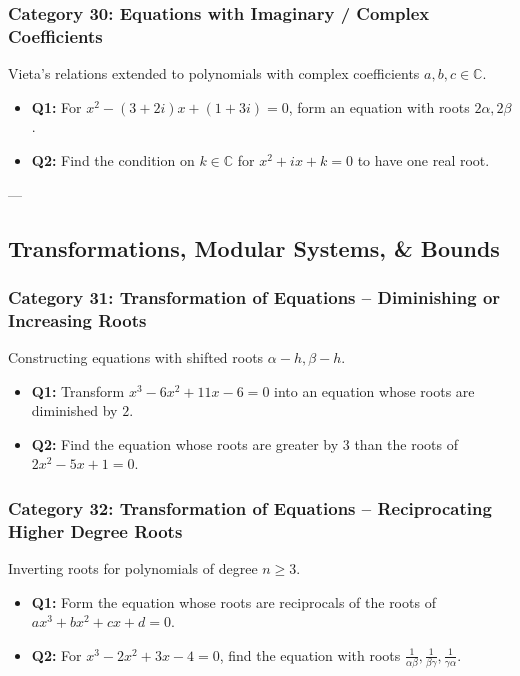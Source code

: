 \documentclass[10pt,a4paper]{article}
\begin{document}
\subsubsection{Category 30: Equations with Imaginary / Complex Coefficients}
Vieta's relations extended to polynomials with complex coefficients $a,b,c \in \mathbb{C}$.
\begin{itemize}[leftmargin=*]
    \item \textbf{Q1:} For $x^2 - (3+2i)x + (1+3i) = 0$, form an equation with roots $2\alpha, 2\beta$.
    \item \textbf{Q2:} Find the condition on $k \in \mathbb{C}$ for $x^2 + ix + k = 0$ to have one real root.
\end{itemize}

---

\subsection{Transformations, Modular Systems, \& Bounds}

\subsubsection{Category 31: Transformation of Equations – Diminishing or Increasing Roots}
Constructing equations with shifted roots $\alpha - h, \beta - h$.
\begin{itemize}[leftmargin=*]
    \item \textbf{Q1:} Transform $x^3 - 6x^2 + 11x - 6 = 0$ into an equation whose roots are diminished by $2$.
    \item \textbf{Q2:} Find the equation whose roots are greater by $3$ than the roots of $2x^2 - 5x + 1 = 0$.
\end{itemize}

\subsubsection{Category 32: Transformation of Equations – Reciprocating Higher Degree Roots}
Inverting roots for polynomials of degree $n \ge 3$.
\begin{itemize}[leftmargin=*]
    \item \textbf{Q1:} Form the equation whose roots are reciprocals of the roots of $ax^3 + bx^2 + cx + d = 0$.
    \item \textbf{Q2:} For $x^3 - 2x^2 + 3x - 4 = 0$, find the equation with roots $\frac{1}{\alpha\beta}, \frac{1}{\beta\gamma}, \frac{1}{\gamma\alpha}$.
\end{itemize}
\end{document}
